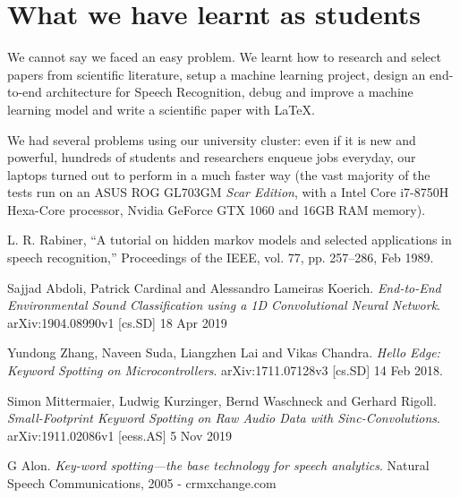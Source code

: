 \documentclass[conference]{IEEEtran}
\begin{document}
\section*{What we have learnt as students}
We cannot say we faced an easy problem. We learnt how to research and select papers from scientific literature, setup a machine learning project, design an end-to-end architecture for Speech Recognition, debug and improve a machine learning model and write a scientific paper with \LaTeX\xspace.

We had several problems using our university cluster: even if it is new and powerful, hundreds of students and researchers enqueue jobs everyday, our laptops turned out to perform in a much faster way (the vast majority of the tests run on an ASUS ROG GL703GM \textit{Scar Edition}, with a Intel Core i7-8750H Hexa-Core processor, Nvidia  GeForce GTX 1060 and 16GB RAM memory).

\begin{thebibliography}{1}
L. R. Rabiner, “A tutorial on hidden markov models and selected applications in speech recognition,” Proceedings of the IEEE, vol. 77, pp. 257–286, Feb 1989.

Sajjad Abdoli, Patrick Cardinal and Alessandro Lameiras Koerich. \textit{End-to-End Environmental Sound Classification using a 1D Convolutional Neural Network}. arXiv:1904.08990v1 [cs.SD] 18 Apr 2019

Yundong Zhang, Naveen Suda, Liangzhen Lai and Vikas Chandra. \textit{Hello Edge: Keyword Spotting on Microcontrollers}. arXiv:1711.07128v3 [cs.SD] 14 Feb 2018.

Simon Mittermaier, Ludwig Kurzinger, Bernd Waschneck and Gerhard Rigoll. \textit{Small-Footprint Keyword Spotting on Raw Audio Data with Sinc-Convolutions}. arXiv:1911.02086v1 [eess.AS] 5 Nov 2019

G Alon. \textit{Key-word spotting—the base technology for speech analytics}. Natural Speech Communications, 2005 - crmxchange.com
\end{thebibliography}
\end{document}
